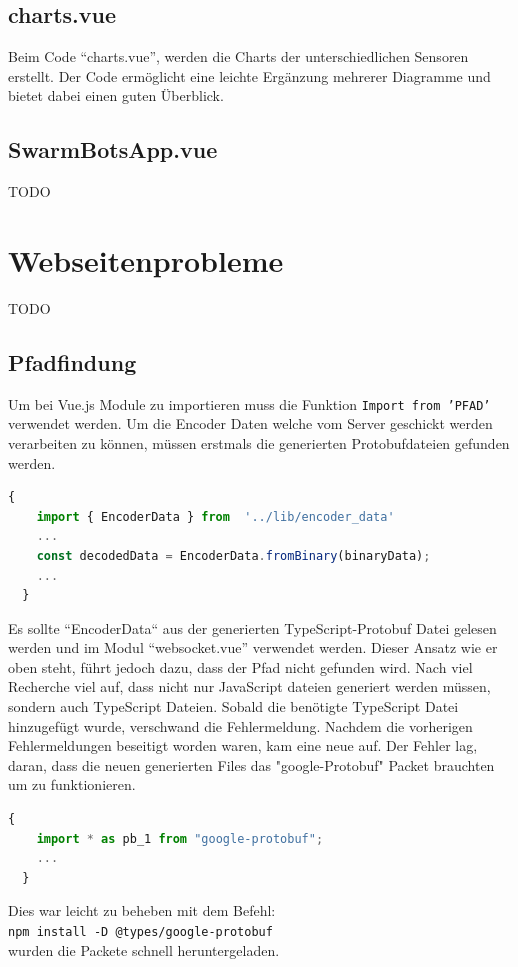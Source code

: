 \subsection{charts.vue}
\label{subsec:frontend_charts.vue}
Beim Code ``charts.vue'', werden die Charts der unterschiedlichen Sensoren erstellt.
%
Der Code ermöglicht eine leichte Ergänzung mehrerer Diagramme und bietet dabei einen guten Überblick.
%



\subsection{SwarmBotsApp.vue}
\label{subsec:frontend_SwarmBotsApp.vue}
TODO

\section{Webseitenprobleme}
\label{subsec:problem_Webseite}
TODO

\subsection{Pfadfindung}
\label{subsubsec:problem_Pfadfindung}
Um bei Vue.js Module zu importieren muss die Funktion \texttt{Import from 'PFAD'} verwendet werden.
%
Um die Encoder Daten welche vom Server geschickt werden verarbeiten zu können, 
müssen erstmals die generierten Protobufdateien gefunden werden.
%
\begin{lstlisting}[language=JavaScript,gobble=4]
  {
    import { EncoderData } from  '../lib/encoder_data'
    ...
    const decodedData = EncoderData.fromBinary(binaryData);
    ...
  }
\end{lstlisting}
Es sollte ``EncoderData`` aus der generierten TypeScript-Protobuf Datei gelesen werden und im Modul ``websocket.vue'' verwendet werden.
Dieser Ansatz wie er oben steht, führt jedoch dazu, dass der Pfad nicht gefunden wird. 
%
Nach viel Recherche viel auf, dass nicht nur JavaScript dateien generiert werden müssen, sondern auch TypeScript Dateien.
Sobald die benötigte TypeScript Datei hinzugefügt wurde, verschwand die Fehlermeldung.
%
Nachdem die vorherigen Fehlermeldungen beseitigt worden waren, kam eine neue auf. 
Der Fehler lag, daran, dass die neuen generierten Files das "google-Protobuf" Packet brauchten um zu funktionieren.
% 
\begin{lstlisting}[language=JavaScript,gobble=4]
  {
    import * as pb_1 from "google-protobuf";
    ...
  }
\end{lstlisting}
Dies war leicht zu beheben mit dem Befehl:\\ \texttt{npm install -D @types/google-protobuf} \\ wurden die Packete schnell
heruntergeladen.

